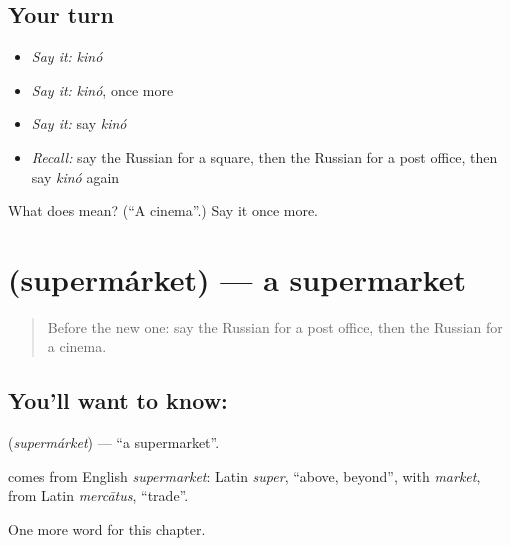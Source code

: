 \subsection*{Your turn}
\begin{itemize}
\raggedright
  \item \emph{Say it:} \emph{kinó}
  \item \emph{Say it:} \emph{kinó}, once more
  \item \emph{Say it:} say \emph{kinó}
  \item \emph{Recall:} say the Russian for a square, then the Russian for a post office, then say \emph{kinó} again
\end{itemize}

\begin{tcolorbox}[breakable,colback=teal!4,colframe=teal!35!black,title={Before you move on}]
What does  mean? (\textquotedblleft{}A cinema\textquotedblright{}.) Say it once more.
\end{tcolorbox}
\section[\texorpdfstring{\ru{супермаркет} (supermárket)}{супермаркет (supermárket)}]{ (supermárket) — a supermarket}

\label{lesson:RU-C88-supermarket}



\begin{quote}
Before the new one: say the Russian for a post office, then the Russian for a cinema.
\end{quote}

\subsection*{You'll want to know: }
\textbf{} (\emph{supermárket}) — \textquotedblleft{}a supermarket\textquotedblright{}.

\begin{cousinweb}
\textbf{} comes from English \emph{supermarket}: Latin \emph{super}, \textquotedblleft{}above, beyond\textquotedblright{}, with \emph{market}, from Latin \emph{mercātus}, \textquotedblleft{}trade\textquotedblright{}.
\end{cousinweb}

\begin{grammarlens}[title={What you've built}]
One more word for this chapter.
\end{grammarlens}

